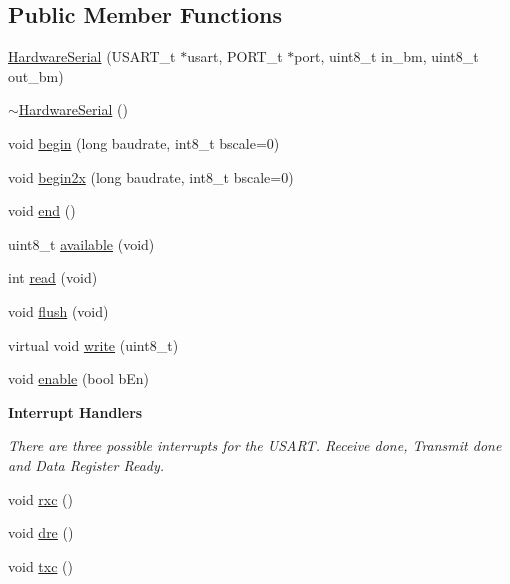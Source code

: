 \subsection*{Public Member Functions}
\begin{DoxyCompactItemize}
\item 
\hyperlink{class_hardware_serial_ab96331f0886097eb802a7839676ef645}{HardwareSerial} (USART\_\-t $\ast$usart, PORT\_\-t $\ast$port, uint8\_\-t in\_\-bm, uint8\_\-t out\_\-bm)
\item 
\hyperlink{class_hardware_serial_a1c7aae049aba33b03fe030960c1c4aa7}{$\sim$HardwareSerial} ()
\item 
void \hyperlink{class_hardware_serial_a11049d350f4cf4bfdaafb24bb2738556}{begin} (long baudrate, int8\_\-t bscale=0)
\item 
void \hyperlink{class_hardware_serial_adcfab60db442174cb53f005df6d2996d}{begin2x} (long baudrate, int8\_\-t bscale=0)
\item 
void \hyperlink{class_hardware_serial_a0f86c41f580e04bdf30ea00e9014eacd}{end} ()
\item 
uint8\_\-t \hyperlink{class_hardware_serial_a10e05fa62dc473d0d8a7ee8184f504ba}{available} (void)
\item 
int \hyperlink{class_hardware_serial_a618696608a5fddcf3cb48ad6f044e756}{read} (void)
\item 
void \hyperlink{class_hardware_serial_a1eeb094d8da77e0292f95f4498a5396f}{flush} (void)
\item 
virtual void \hyperlink{class_hardware_serial_aced05ab99953383a235ccfb366f5c98f}{write} (uint8\_\-t)
\item 
void \hyperlink{class_hardware_serial_a2e13244413a84a259cadab3fb452921a}{enable} (bool bEn)
\end{DoxyCompactItemize}
\begin{Indent}{\bf Interrupt Handlers}\par
{\em There are three possible interrupts for the USART. Receive done, Transmit done and Data Register Ready. }\begin{DoxyCompactItemize}
\item 
void \hyperlink{class_hardware_serial_ac52002a727070c45b765d0dc55106cad}{rxc} ()
\item 
void \hyperlink{class_hardware_serial_ac33af9a86da3e3ae7ac1e2791c8eaf22}{dre} ()
\item 
void \hyperlink{class_hardware_serial_a82779b03507bc07f3bf2e090d3733015}{txc} ()
\end{DoxyCompactItemize}
\end{Indent}
